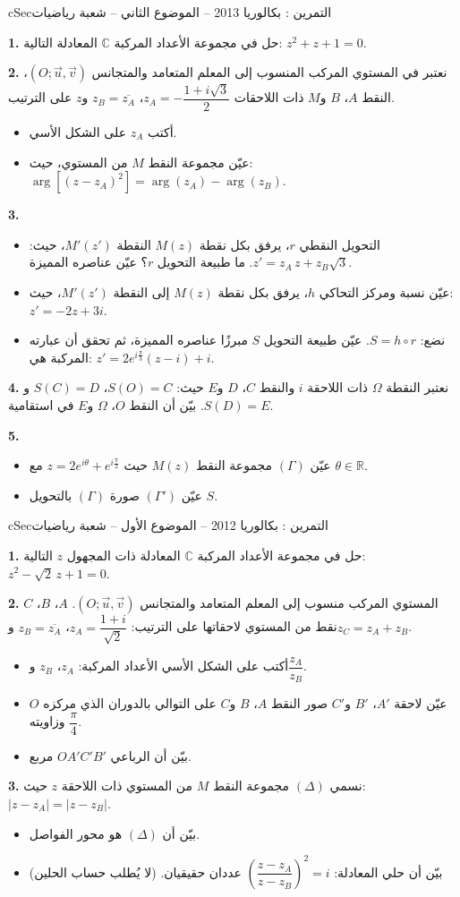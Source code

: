 \documentclass[12pt,a4paper]{article}
\newenvironment{BOX}[2]{\begin{otherlanguage}{english}\begin{arbox}{#1}{#2}}{\end{arbox}\end{otherlanguage}}
\newcounter{exo}
\newenvironment{tamrin}[1]{\stepcounter{exo}\begin{BOX}{cSec}{التمرين \theexo: #1}}{\end{BOX}}
\newcommand{\R}{\mathbb{R}}
\newenvironment{sq}{\begin{itemize}[leftmargin=2.4em,itemsep=3pt]}{\end{itemize}}
\newcommand{\qa}{\item[(أ)]}\newcommand{\qb}{\item[(ب)]}\newcommand{\qc}{\item[(جـ)]}\newcommand{\qd}{\item[(د)]}\newcommand{\qe}{\item[(هـ)]}
\newcommand{\QQ}[1]{\par\smallskip\textbf{#1.} }
\begin{document}
\begin{tamrin}{بكالوريا 2013 -- الموضوع الثاني -- شعبة رياضيات}
\QQ{1} حل في مجموعة الأعداد المركبة $\mathbb C$ المعادلة التالية: $z^2+z+1=0$.
\QQ{2} نعتبر في المستوي المركب المنسوب إلى المعلم المتعامد والمتجانس $(O;\vec u,\vec v)$، النقط $A$، $B$ و$M$ ذات اللاحقات $z_A=-\dfrac{1+i\sqrt3}{2}$، $z_B=\overline{z_A}$ و$z$ على الترتيب.
\begin{sq}
\qa أكتب $z_A$ على الشكل الأسي.
\qb عيّن مجموعة النقط $M$ من المستوي، حيث: $\arg\left[(z-z_A)^2\right]=\arg(z_A)-\arg(z_B)$.
\end{sq}
\QQ{3}
\begin{sq}
\qa التحويل النقطي $r$، يرفق بكل نقطة $M(z)$ النقطة $M'(z')$، حيث: $z'=z_A\,z+z_B\sqrt3$. ما طبيعة التحويل $r$؟ عيّن عناصره المميزة.
\qb عيّن نسبة ومركز التحاكي $h$، يرفق بكل نقطة $M(z)$ إلى النقطة $M'(z')$، حيث: $z'=-2z+3i$.
\qc نضع: $S=h\circ r$. عيّن طبيعة التحويل $S$ مبرزًا عناصره المميزة، ثم تحقق أن عبارته المركبة هي: $z'=2e^{i\frac{\pi}{3}}(z-i)+i$.
\end{sq}
\QQ{4} نعتبر النقطة $\Omega$ ذات اللاحقة $i$ والنقط $C$، $D$ و$E$ حيث: $S(O)=C$، $S(C)=D$ و$S(D)=E$.
بيّن أن النقط $O$، $\Omega$ و$E$ في استقامية.
\QQ{5}
\begin{sq}
\qa عيّن $(\Gamma)$ مجموعة النقط $M(z)$ حيث $z=2e^{i\theta}+e^{i\frac{\pi}{2}}$ مع $\theta\in\R$.
\qb عيّن $(\Gamma')$ صورة $(\Gamma)$ بالتحويل $S$.
\end{sq}
\end{tamrin}

\begin{tamrin}{بكالوريا 2012 -- الموضوع الأول -- شعبة رياضيات}
\QQ{1} حل في مجموعة الأعداد المركبة $\mathbb C$ المعادلة ذات المجهول $z$ التالية: $z^2-\sqrt2\,z+1=0$.
\QQ{2} المستوي المركب منسوب إلى المعلم المتعامد والمتجانس $(O;\vec u,\vec v)$. $A$، $B$، $C$ نقط من المستوي لاحقاتها على الترتيب: $z_A=\dfrac{1+i}{\sqrt2}$، $z_B=\overline{z_A}$ و$z_C=z_A+z_B$.
\begin{sq}
\qa أكتب على الشكل الأسي الأعداد المركبة: $z_A$، $z_B$ و$\dfrac{z_A}{z_B}$.
\qb عيّن لاحقة $A'$، $B'$ و$C'$ صور النقط $A$، $B$ و$C$ على التوالي بالدوران الذي مركزه $O$ وزاويته $\dfrac{\pi}{4}$.
\qc بيّن أن الرباعي $OA'C'B'$ مربع.
\end{sq}
\QQ{3} نسمي $(\Delta)$ مجموعة النقط $M$ من المستوي ذات اللاحقة $z$ حيث: $|z-z_A|=|z-z_B|$.
\begin{sq}
\qa بيّن أن $(\Delta)$ هو محور الفواصل.
\qb بيّن أن حلي المعادلة: $\left(\dfrac{z-z_A}{z-z_B}\right)^2=i$ عددان حقيقيان. (لا يُطلب حساب الحلين)
\end{sq}
\end{tamrin}
\end{document}
